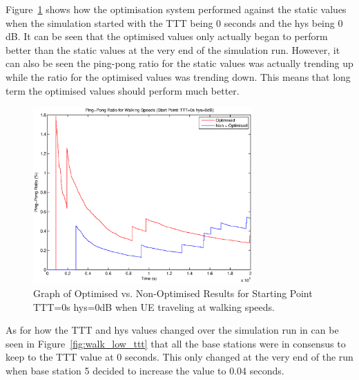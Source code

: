 Figure~\ref{fig:walk_low_ping} shows how the optimisation system performed against the static values when the simulation started with the TTT being 0 seconds and the hys being 0 dB. It can be seen that the optimised values only actually began to perform better than the static values at the very end of the simulation run. However, it can also be seen the ping-pong ratio for the static values was actually trending up while the ratio for the optimised values was trending down. This means that long term the optimised values should perform much better. 
\begin{figure}[H]
  \begin{center}
    	  \includegraphics[width=0.75\textwidth]{figures/walking_figures/low/long_ping.eps}
    \end{center}
    \caption{Graph of Optimised vs. Non-Optimised Results for Starting Point TTT=0s hys=0dB when UE traveling at walking speeds.}
    \label{fig:walk_low_ping}
\end{figure}
As for how the TTT and hys values changed over the simulation run in can be seen in Figure~\ref{fig:walk_low_ttt} that all the base stations were in consensus to keep to the TTT value at 0 seconds. This only changed at the very end of the run when base station 5 decided to increase the value to 0.04 seconds.

